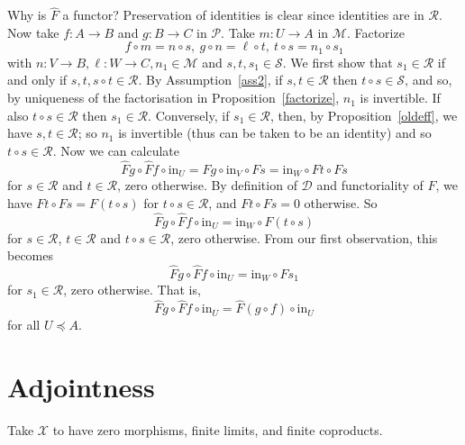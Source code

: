 \documentclass[a4paper,12pt,reqno]{amsart}
\theoremstyle{definition}
\theoremstyle{fact}
\theoremstyle{genquest}
\theoremstyle{step}
\newcommand{\ra}{\rightarrow}
\def\CD{{\mathscr D}}
\def\CM{{\mathscr M}}
\def\CP{{\mathscr P}}
\def\CR{{\mathscr R}}
\def\CS{{\mathscr S}}
\def\CX{{\mathscr X}}
\begin{document}
Why is $\widehat{F}$ a functor? Preservation of identities is clear since identities are in $\CR$.
Now take $f:A\ra B$ and $g:B\ra C$ in $\CP$. Take $m:U\ra A$ in $\CM$. Factorize 
$$f\circ m = n\circ s, \ g\circ n = \ell \circ t, \ t\circ s = n_1\circ s_1$$ 
with $n:V\ra B, \ell :W\ra C, n_1 \in \CM$ and $s, t, s_1\in \CS$. 
We first show that $s_1\in \CR$ if and only if $s, t, s\circ t \in \CR$.
By Assumption~\ref{ass2}, if $s, t \in \CR$ then $t\circ s\in \CS$,
and so, by uniqueness of the factorisation in Proposition~\ref{factorize}, 
$n_1$ is invertible.
If also $t\circ s \in \CR$ then $s_1 \in \CR$. 
Conversely, if $s_1 \in \CR$,
then, by Proposition~\ref{oldeff}, we have $s, t \in \CR$; so
$n_1$ is invertible (thus can be taken to be an identity) and so $t\circ s \in \CR$.       
Now we can calculate 
$$\widehat{F}g\circ \widehat{F}f \circ \mathrm{in}_U 
= \widehat{F}g\circ \mathrm{in}_V \circ Fs
= \mathrm{in}_W \circ Ft\circ Fs$$      
for $s\in \CR$ and $t\in \CR$, zero otherwise.
By definition of $\CD$ and functoriality of $F$, we have $Ft\circ Fs = F(t\circ s)$
for $t\circ s \in \CR$, and $Ft\circ Fs = 0$ otherwise. So
$$\widehat{F}g\circ \widehat{F}f \circ \mathrm{in}_U 
= \mathrm{in}_{W} \circ F(t\circ s)$$
for $s\in \CR$, $t\in \CR$ and $t\circ s \in \CR$, zero otherwise. 
From our first observation, this becomes
$$\widehat{F}g\circ \widehat{F}f \circ \mathrm{in}_U 
= \mathrm{in}_{W} \circ Fs_1$$
for $s_1 \in \CR$, zero otherwise. That is, 
$$\widehat{F}g\circ \widehat{F}f \circ \mathrm{in}_U 
= \widehat{F}(g\circ f) \circ \mathrm{in}_U$$
for all $U\preceq A$.

\section{Adjointness}\label{adjointness}

Take $\CX$ to have zero morphisms, finite limits, and finite coproducts.
\end{document}
